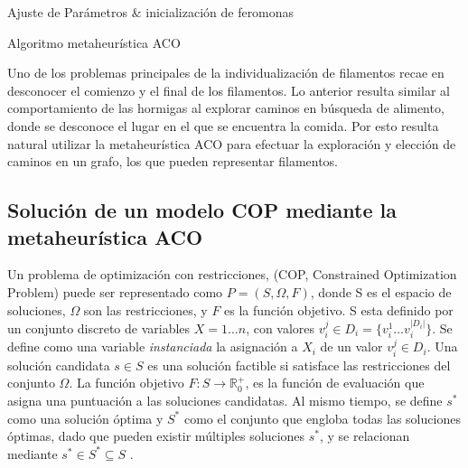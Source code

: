 \begin{algorithm}[H]
\SetAlgoLined
 Ajuste de Par\'ametros \& inicializaci\'on de feromonas\;
 \caption{Algoritmo metaheur\'istica ACO}\label{ACO-Algo}
\end{algorithm}

Uno de los problemas principales de la individualizaci\'on de filamentos recae en desconocer el comienzo y el final de los filamentos. Lo anterior resulta similar al comportamiento de las hormigas al explorar caminos en b\'usqueda de alimento, donde se desconoce el lugar en el que se encuentra la comida. Por esto resulta natural utilizar la metaheur\'istica ACO para efectuar la exploraci\'on y elecci\'on de caminos en un grafo, los que pueden representar filamentos.


\subsection{Soluci\'on de un modelo COP mediante la metaheur\'istica ACO}

Un problema de optimización con restricciones, (COP, Constrained Optimization Problem) puede ser representado como $P = (S, \Omega, F)$, donde S es el espacio de soluciones, $\Omega$ son las restricciones, y $F$ es la funci\'on objetivo. S esta definido por un conjunto discreto de variables $X = 1 \dotsc n$, con valores $v_{i}^{j} \in D_{i} = \{v_{i}^{1} \dotsc  v_{i}^{|D_{i}|}\}$. Se define como una variable {\it instanciada} la asignaci\'on a $X_i$ de un valor $v_{i}^{j} \in D_i$. Una solución candidata $s \in S$ es una soluci\'on factible si satisface las restricciones del conjunto $\Omega$. La funci\'on objetivo $F: S\rightarrow \mathbb R_{0}^{+}$, es la funci\'on de evaluaci\'on que asigna una puntuaci\'on a las soluciones candidatas. Al mismo tiempo, se define $s^{*}$ como una soluci\'on \'optima y $S^{*}$ como el conjunto que engloba todas las soluciones \'optimas, dado que pueden existir m\'ultiples soluciones $s^{*}$, y se relacionan mediante $s^{*} \in S^{*} \subseteq S $ \cite{socha2008ant}.

